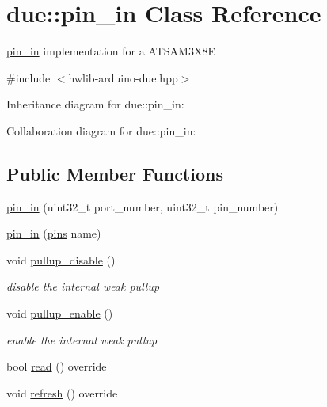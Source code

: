 \hypertarget{classdue_1_1pin__in}{}\section{due\+:\+:pin\+\_\+in Class Reference}
\label{classdue_1_1pin__in}


\hyperlink{classdue_1_1pin__in}{pin\+\_\+in} implementation for a A\+T\+S\+A\+M3\+X8E  




{\ttfamily \#include $<$hwlib-\/arduino-\/due.\+hpp$>$}



Inheritance diagram for due\+:\+:pin\+\_\+in\+:


Collaboration diagram for due\+:\+:pin\+\_\+in\+:
\subsection*{Public Member Functions}
\begin{DoxyCompactItemize}
\item 
\hyperlink{classdue_1_1pin__in_a5c42406ed2241133b3dfa3bbd73083b2}{pin\+\_\+in} (uint32\+\_\+t port\+\_\+number, uint32\+\_\+t pin\+\_\+number)
\item 
\hyperlink{classdue_1_1pin__in_a91f66ca279e18ced46cf693bcf3c0935}{pin\+\_\+in} (\hyperlink{namespacedue_a8ffa3ec309934ff9db34317e504bcc92}{pins} name)
\item 
\mbox{\label{classdue_1_1pin__in_a7fc705239315bc681632c10274521b0b}} 
void \hyperlink{classdue_1_1pin__in_a7fc705239315bc681632c10274521b0b}{pullup\+\_\+disable} ()
\begin{DoxyCompactList}\small\item\em disable the internal weak pullup \end{DoxyCompactList}\item 
\mbox{\label{classdue_1_1pin__in_a0eeab386c01dafe2340ba2d4a55ca78b}} 
void \hyperlink{classdue_1_1pin__in_a0eeab386c01dafe2340ba2d4a55ca78b}{pullup\+\_\+enable} ()
\begin{DoxyCompactList}\small\item\em enable the internal weak pullup \end{DoxyCompactList}\item 
bool \hyperlink{classdue_1_1pin__in_aa032c49b961b38e4afaeb4a811311449}{read} () override
\item 
void \hyperlink{classdue_1_1pin__in_aa83ead7fe5283fc95bae295ed1a35bd3}{refresh} () override
\end{DoxyCompactItemize}


